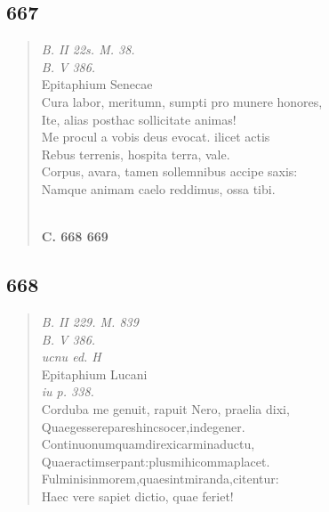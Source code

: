 \documentclass[11pt, a4paper]{report}
\begin{document}
            \subsection*{667}
      \begin{verse}
      \textit{B. II 22s. M. 38.} \\ \textit{B. V 386.} \\ Epitaphium Senecae \\ Cura labor, meritumn, sumpti pro munere honores, \\ Ite, alias posthac sollicitate animas! \\ Me procul a vobis deus evocat. ilicet actis \\ Rebus terrenis, hospita terra, vale. \\ Corpus, avara, tamen sollemnibus accipe saxis: \\ Namque animam caelo reddimus, ossa tibi. \\ 
        ﻿\pagebreak 
    \begin{center} \textbf{C. 668 669} \end{center} \marginpar{[139]} 
      \end{verse}
  
            \subsection*{668}
      \begin{verse}
      \textit{B. II 229. M. 839} \\ \textit{B. V 386.} \\ \textit{ucnu ed. H} \\ Epitaphium Lucani \\ \textit{iu p. 338.} \\ Corduba me genuit, rapuit Nero, praelia dixi, \\ Quaegesserepareshincsocer,indegener. \\ Continuonumquamdirexicarminaductu, \\ Quaeractimserpant:plusmihicommaplacet. \\ Fulminisinmorem,quaesintmiranda,citentur: \\ Haec vere sapiet dictio, quae feriet! \\ 
      \end{verse}
  
\end{document}
